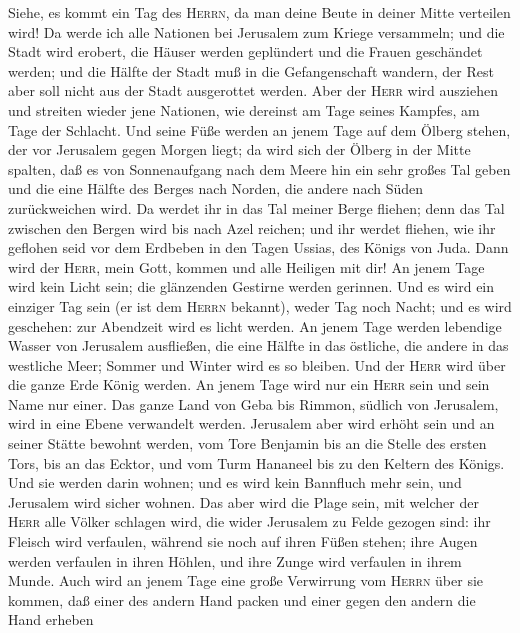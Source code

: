  Siehe, es kommt ein Tag des \textsc{Herrn}, da man deine
Beute in deiner Mitte verteilen wird!  Da werde ich alle
Nationen bei Jerusalem zum Kriege versammeln; und die Stadt wird
erobert, die Häuser werden geplündert und die Frauen geschändet werden;
und die Hälfte der Stadt muß in die Gefangenschaft wandern, der Rest
aber soll nicht aus der Stadt ausgerottet werden.  Aber
der \textsc{Herr} wird ausziehen und streiten wieder jene Nationen, wie
dereinst am Tage seines Kampfes, am Tage der Schlacht. 
Und seine Füße werden an jenem Tage auf dem Ölberg stehen, der vor
Jerusalem gegen Morgen liegt; da wird sich der Ölberg in der Mitte
spalten, daß es von Sonnenaufgang nach dem Meere hin ein sehr großes Tal
geben und die eine Hälfte des Berges nach Norden, die andere nach Süden
zurückweichen wird.  Da werdet ihr in das Tal meiner Berge
fliehen; denn das Tal zwischen den Bergen wird bis nach Azel reichen;
und ihr werdet fliehen, wie ihr geflohen seid vor dem Erdbeben in den
Tagen Ussias, des Königs von Juda. Dann wird der \textsc{Herr}, mein
Gott, kommen und alle Heiligen mit dir!  An jenem Tage
wird kein Licht sein; die glänzenden Gestirne werden gerinnen.
 Und es wird ein einziger Tag sein (er ist dem
\textsc{Herrn} bekannt), weder Tag noch Nacht; und es wird geschehen:
zur Abendzeit wird es licht werden.  An jenem Tage werden
lebendige Wasser von Jerusalem ausfließen, die eine Hälfte in das
östliche, die andere in das westliche Meer; Sommer und Winter wird es so
bleiben.  Und der \textsc{Herr} wird über die ganze Erde
König werden. An jenem Tage wird nur ein \textsc{Herr} sein und sein
Name nur einer.  Das ganze Land von Geba bis Rimmon,
südlich von Jerusalem, wird in eine Ebene verwandelt werden. Jerusalem
aber wird erhöht sein und an seiner Stätte bewohnt werden, vom Tore
Benjamin bis an die Stelle des ersten Tors, bis an das Ecktor, und vom
Turm Hananeel bis zu den Keltern des Königs.  Und sie
werden darin wohnen; und es wird kein Bannfluch mehr sein, und Jerusalem
wird sicher wohnen.  Das aber wird die Plage sein, mit
welcher der \textsc{Herr} alle Völker schlagen wird, die wider Jerusalem
zu Felde gezogen sind: ihr Fleisch wird verfaulen, während sie noch auf
ihren Füßen stehen; ihre Augen werden verfaulen in ihren Höhlen, und
ihre Zunge wird verfaulen in ihrem Munde.  Auch wird an
jenem Tage eine große Verwirrung vom \textsc{Herrn} über sie kommen, daß
einer des andern Hand packen und einer gegen den andern die Hand erheben
